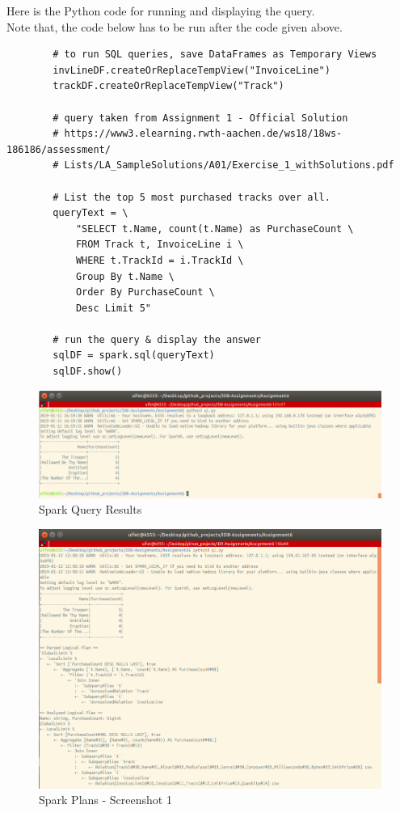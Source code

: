\documentclass[10pt]{article}
\begin{document}
\begin{enumerate}
		Here is the Python code for running and displaying the query.\\
		Note that, the code below has to be run after the code given above.\\
		
		\begin{lstlisting}
		# to run SQL queries, save DataFrames as Temporary Views
		invLineDF.createOrReplaceTempView("InvoiceLine")
		trackDF.createOrReplaceTempView("Track")
		
		# query taken from Assignment 1 - Official Solution
		# https://www3.elearning.rwth-aachen.de/ws18/18ws-186186/assessment/
		# Lists/LA_SampleSolutions/A01/Exercise_1_withSolutions.pdf
		
		# List the top 5 most purchased tracks over all.
		queryText = \
			"SELECT t.Name, count(t.Name) as PurchaseCount \
			FROM Track t, InvoiceLine i \
			WHERE t.TrackId = i.TrackId \
			Group By t.Name \
			Order By PurchaseCount \
			Desc Limit 5"
		
		# run the query & display the answer
		sqlDF = spark.sql(queryText)
		sqlDF.show()
		\end{lstlisting}
		
		\bigskip
		\begin{figure}[H]
			\centering
			\includegraphics[scale=0.40]{spark_query.png}
			\caption{Spark Query Results}
		\end{figure}
		\bigskip
		
		\bigskip
		\begin{figure}[H]
			\centering
			\includegraphics[scale=0.40]{all_plans_1.png}
			\caption{Spark Plans - Screenshot 1}
		\end{figure}
		\bigskip
		

\end{enumerate}
\end{document}
